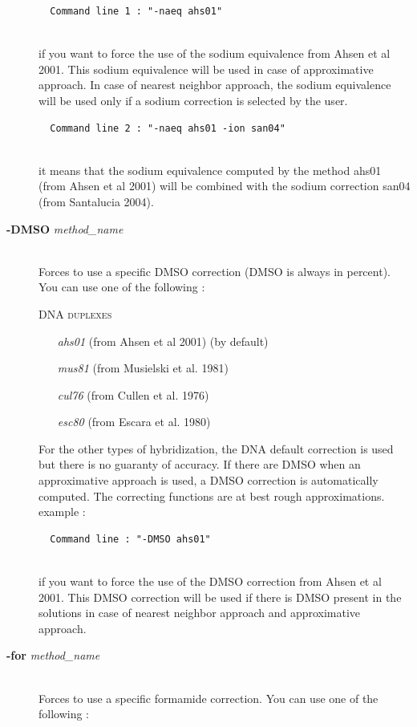 \documentclass{article}
\begin{document}
\begin{description}
  \begin{verbatim}
  Command line 1 : "-naeq ahs01" 
  
    \end{verbatim}
  if you want to force the use of the sodium equivalence from Ahsen et al 2001. This sodium equivalence 
  will be used in case of approximative approach. In case of nearest neighbor approach, the sodium equivalence 
  will be used only if a sodium correction is selected by the user.
    
    \begin{verbatim}
  Command line 2 : "-naeq ahs01 -ion san04" 
  
    \end{verbatim}
  it means that the sodium equivalence computed by the method ahs01 (from Ahsen et al 2001) will be combined with the 
  sodium correction san04 (from Santalucia 2004).
  
  
\item [\textbf{-DMSO} \textit{method\_name}]\mbox{}\\ 
  Forces to use a specific DMSO correction (DMSO is always in percent).
  You can use one of the following :
  
  \textsc{DNA duplexes}
    \begin{itemize}
    \item [\textit{ahs01}] (from Ahsen et al 2001)  (by default)
    \item [\textit{mus81}] (from Musielski et al. 1981)
    \item [\textit{cul76}] (from Cullen et al. 1976)	
    \item [\textit{esc80}] (from Escara et al. 1980)		 	 
    \end{itemize}
  For the other types of hybridization, the DNA default correction is used but there is no guaranty of accuracy.
  If there are DMSO when an approximative approach is used, a DMSO correction is automatically computed.
  The correcting functions are  at  best rough  approximations.
  example :
  
  \begin{verbatim}
  Command line : "-DMSO ahs01"  
  
  \end{verbatim} 
  if you want to force the use of the DMSO correction from Ahsen et al 2001. This DMSO correction will be used if there is 
  DMSO present in the solutions in case of nearest neighbor approach and approximative approach.
\item [\textbf{-for} \textit{method\_name}]\mbox{}\\ 
  Forces to use a specific formamide correction.
  You can use one of the following :
  

\end{description}
\end{document}
